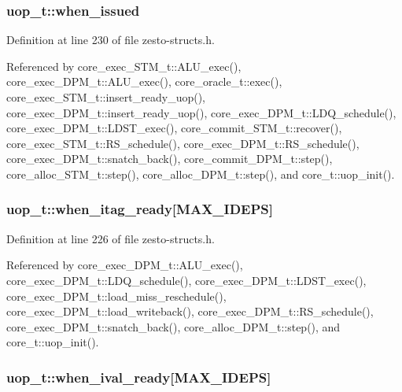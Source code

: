 \subsubsection[{when\_\-issued}]{ {\bf uop\_\-t::when\_\-issued}}\label{structuop__t_780ed24e3aa8b3709e7a93c88ff31132}




Definition at line 230 of file zesto-structs.h.

Referenced by core\_\-exec\_\-STM\_\-t::ALU\_\-exec(), core\_\-exec\_\-DPM\_\-t::ALU\_\-exec(), core\_\-oracle\_\-t::exec(), core\_\-exec\_\-STM\_\-t::insert\_\-ready\_\-uop(), core\_\-exec\_\-DPM\_\-t::insert\_\-ready\_\-uop(), core\_\-exec\_\-DPM\_\-t::LDQ\_\-schedule(), core\_\-exec\_\-DPM\_\-t::LDST\_\-exec(), core\_\-commit\_\-STM\_\-t::recover(), core\_\-exec\_\-STM\_\-t::RS\_\-schedule(), core\_\-exec\_\-DPM\_\-t::RS\_\-schedule(), core\_\-exec\_\-DPM\_\-t::snatch\_\-back(), core\_\-commit\_\-DPM\_\-t::step(), core\_\-alloc\_\-STM\_\-t::step(), core\_\-alloc\_\-DPM\_\-t::step(), and core\_\-t::uop\_\-init().
\subsubsection[{when\_\-itag\_\-ready}]{ {\bf uop\_\-t::when\_\-itag\_\-ready}[MAX\_\-IDEPS]}\label{structuop__t_fdbdf82713fa7baab2635b9cdc40c232}




Definition at line 226 of file zesto-structs.h.

Referenced by core\_\-exec\_\-DPM\_\-t::ALU\_\-exec(), core\_\-exec\_\-DPM\_\-t::LDQ\_\-schedule(), core\_\-exec\_\-DPM\_\-t::LDST\_\-exec(), core\_\-exec\_\-DPM\_\-t::load\_\-miss\_\-reschedule(), core\_\-exec\_\-DPM\_\-t::load\_\-writeback(), core\_\-exec\_\-DPM\_\-t::RS\_\-schedule(), core\_\-exec\_\-DPM\_\-t::snatch\_\-back(), core\_\-alloc\_\-DPM\_\-t::step(), and core\_\-t::uop\_\-init().
\subsubsection[{when\_\-ival\_\-ready}]{ {\bf uop\_\-t::when\_\-ival\_\-ready}[MAX\_\-IDEPS]}\label{structuop__t_6912f9079359470ab0fd61f0f8972ad6}




